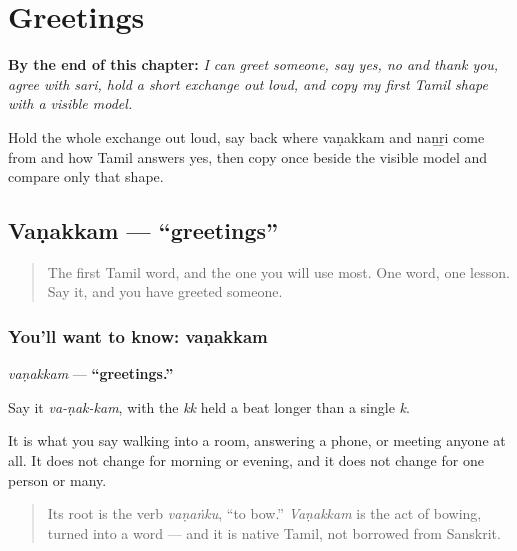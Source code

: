 
\chapter{Greetings}
\label{ch:greetings}

\begin{chapteropening}
\textbf{By the end of this chapter:} \emph{I can greet someone, say yes, no and thank you, agree with sari, hold a short exchange out loud, and copy my first Tamil shape with a visible model.}

Hold the whole exchange out loud, say back where vaṇakkam and naṉṟi come from and how Tamil answers yes, then copy  once beside the visible model and compare only that shape.
\end{chapteropening}

\section[\texorpdfstring{\ta{வணக்கம்} (vaṇakkam)}{வணக்கம் (vaṇakkam)}]{Vaṇakkam — \textquotedblleft{}greetings\textquotedblright{}}

\label{lesson:TA-C01-vanakkam}



\begin{quote}
The first Tamil word, and the one you will use most. One word, one lesson. Say it, and you have greeted someone.
\end{quote}

\subsection*{You'll want to know: vaṇakkam}
\emph{vaṇakkam} — \textbf{\textquotedblleft{}greetings.\textquotedblright{}}

Say it \emph{va-ṇak-kam}, with the \emph{kk} held a beat longer than a single \emph{k}.

It is what you say walking into a room, answering a phone, or meeting anyone at all. It does not change for morning or evening, and it does not change for one person or many.

\begin{quote}
Its root is the verb \emph{vaṇaṅku}, \textquotedblleft{}to bow.\textquotedblright{} \emph{Vaṇakkam} is the act of bowing, turned into a word — and it is native Tamil, not borrowed from Sanskrit.
\end{quote}

